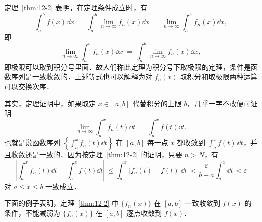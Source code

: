 定理~\ref{thm:12-2} 表明，在定理条件成立时，有
\[
\int_{a}^{b}f(x)\dd x\ =\ \int_{a}^{b}\lim_{n\to\infty}f_{n}(x)\dd x\ =\ \lim_{n\to\infty}\int_{a}^{b}f_{n}(x)\dd x,
\]
即
\[
\lim_{n\to\infty}\int_{a}^{b}f_{n}(x)\dd x\ =\ \int_{a}^{b}\lim_{n\to\infty}f_{n}(x)\dd x,
\]
即极限可以取到积分号里面．故人们称此定理为积分号下取极限的定理，条件是函数序列是一致收敛的．上述等式也可以解释为对 $f_{n}(x)$ 取积分和取极限两种运算可以交换次序．

其实，定理证明中，如果取定 $x\in[a,b]$ 代替积分的上限 $b$，几乎一字不改便可证明
\[
\lim_{n\to\infty}\int_{a}^{x}f_{n}(t)\dd t\ =\ \int_{a}^{x}f(t)\dd t.
\]
也就是说函数序列 $\left\{\displaystyle\int_{a}^{x}f_{n}(t)\dd t\right\}$ 在 $[a,b]$ 每一点 $x$ 都收敛到 $\displaystyle\int_{a}^{x}f(t)\,\dd t$，并且收敛还是一致的．因为按定理~\ref{thm:12-2} 的证明，只要 $n>N$，有
\[
\left|\int_{a}^{x}f_{n}(t)\dd t-\int_{a}^{x}f(t)\dd t\right|\ \leqslant\int_{a}^{x}\left|f_{n}(t)-f(t)\right|\dd t\ <\frac{\varepsilon}{b-a}\int_{a}^{x}\dd t\,<\varepsilon
\]
对 $a\leqslant x\leqslant b$ 一致成立．

下面的例子表明，定理~\ref{thm:12-2} 中 $\{f_{n}(x)\}$ 在 $[a,b]$ 一致收敛到 $f(x)$ 的条件，不能减弱为 $\{f_{n}(x)\}$ 在 $[a,b]$ 逐点收敛到 $f(x)$．

